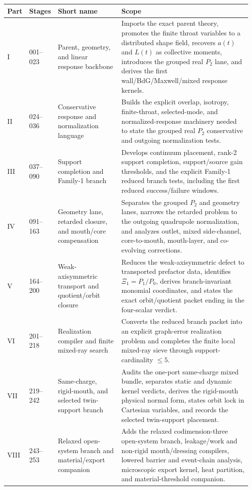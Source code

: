 \begin{longtable}{L{0.13\textwidth}L{0.14\textwidth}L{0.26\textwidth}L{0.38\textwidth}}
\toprule
Part & Stages & Short name & Scope \\
\midrule
\endhead
I & 001--023 & Parent, geometry, and linear response backbone & Imports the exact parent theory, promotes the finite throat variables to a distributed shape field, recovers \(a(t)\) and \(L(t)\) as collective moments, introduces the grouped real \(P_2\) lane, and derives the first wall/BdG/Maxwell/mixed response kernels. \\
\addlinespace
II & 024--036 & Conservative response and normalization language & Builds the explicit overlap, isotropy, finite-throat, selected-mode, and normalized-response machinery needed to state the grouped real \(P_2\) conservative and outgoing normalization tests. \\
\addlinespace
III & 037--090 & Support completion and Family-1 branch & Develops continuum placement, rank-2 support completion, support/source gain thresholds, and the explicit Family-1 reduced branch tests, including the first reduced success/failure windows. \\
\addlinespace
IV & 091--163 & Geometry lane, retarded closure, and mouth/core compensation & Separates the grouped \(P_2\) and geometry lanes, narrows the retarded problem to the outgoing quadrupole normalization, and analyzes outlet, mixed side-channel, core-to-mouth, mouth-layer, and co-evolving corrections. \\
\addlinespace
V & 164--200 & Weak-axisymmetric transport and quotient/orbit closure & Reduces the weak-axisymmetric defect to transported prefactor data, identifies \(\Xi_1=P_1/P_0\), derives branch-invariant monomial coordinates, and states the exact orbit/quotient packet ending in the four-scalar verdict. \\
\addlinespace
VI & 201--218 & Realization compiler and finite mixed-ray search & Converts the reduced branch packet into an explicit graph-error realization problem and completes the finite local mixed-ray sieve through support-cardinality \(\leq 5\). \\
\addlinespace
VII & 219--242 & Same-charge, rigid-mouth, and selected twin-support branch & Audits the one-port same-charge mixed bundle, separates static and dynamic kernel verdicts, derives the rigid-mouth physical normal form, states orbit lock in Cartesian variables, and records the selected twin-support placement. \\
\addlinespace
VIII & 243--253 & Relaxed open-system branch and material/export companion & Adds the relaxed codimension-three open-system branch, leakage/work and non-rigid mouth/dressing compilers, lowered barrier and event-chain analysis, microscopic export kernel, heat partition, and material-threshold companion. \\
\bottomrule
\end{longtable}

